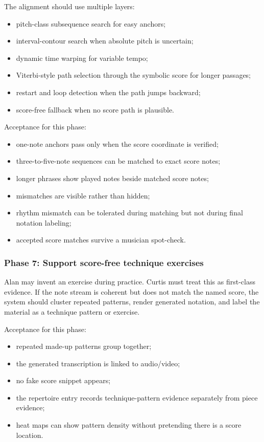The alignment should use multiple layers:
\begin{itemize}
    \item pitch-class subsequence search for easy anchors;
    \item interval-contour search when absolute pitch is uncertain;
    \item dynamic time warping for variable tempo;
    \item Viterbi-style path selection through the symbolic score for longer passages;
    \item restart and loop detection when the path jumps backward;
    \item score-free fallback when no score path is plausible.
\end{itemize}

Acceptance for this phase:
\begin{itemize}
    \item one-note anchors pass only when the score coordinate is verified;
    \item three-to-five-note sequences can be matched to exact score notes;
    \item longer phrases show played notes beside matched score notes;
    \item mismatches are visible rather than hidden;
    \item rhythm mismatch can be tolerated during matching but not during final notation labeling;
    \item accepted score matches survive a musician spot-check.
\end{itemize}

\subsubsection*{Phase 7: Support score-free technique exercises}

Alan may invent an exercise during practice. Curtis must treat this as first-class evidence. If the note stream is coherent but does not match the named score, the system should cluster repeated patterns, render generated notation, and label the material as a technique pattern or exercise.

Acceptance for this phase:
\begin{itemize}
    \item repeated made-up patterns group together;
    \item the generated transcription is linked to audio/video;
    \item no fake score snippet appears;
    \item the repertoire entry records technique-pattern evidence separately from piece evidence;
    \item heat maps can show pattern density without pretending there is a score location.
\end{itemize}

